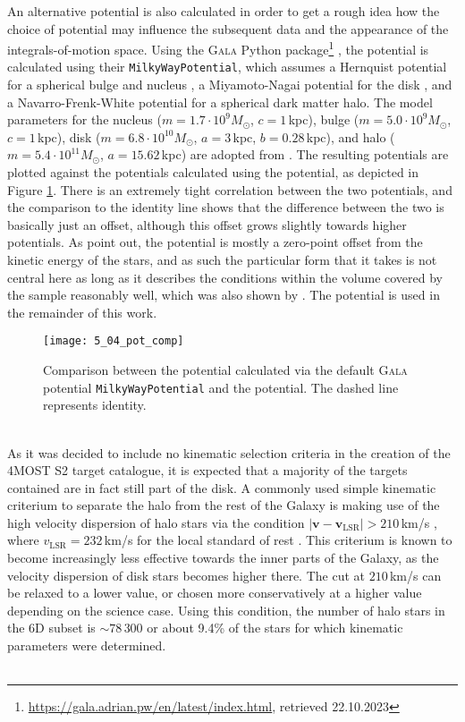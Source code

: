 \documentclass[a4paper,11pt]{article}
\begin{document}
An alternative potential is also calculated in order to get a rough idea how the choice of potential may influence the subsequent data and the appearance of the integrals-of-motion space. Using the \textsc{Gala} Python package\footnote{\url{https://gala.adrian.pw/en/latest/index.html}, retrieved 22.10.2023} \citep{gala,gala_soft}, the potential is calculated using their {\tt MilkyWayPotential}, which assumes a Hernquist potential for a spherical bulge and nucleus \citep{hernquist90}, a Miyamoto-Nagai potential for the disk \citep{bovy15,miyamoto75}, and a Navarro-Frenk-White potential for a spherical dark matter halo. The model parameters for the nucleus ($m=1.7\cdot10^9M_\odot$, $c=1$\,kpc), bulge ($m=5.0\cdot10^9M_\odot$, $c=1$\,kpc), disk ($m=6.8\cdot10^{10}M_\odot$, $a=3$\,kpc, $b=0.28$\,kpc), and halo ($m=5.4\cdot10^{11}M_\odot$, $a=15.62$\,kpc) are adopted from \citet{naidu20}. The resulting potentials are plotted against the potentials calculated using the \citet{mcmillan17} potential, as depicted in Figure \ref{fig:pot_comp}. There is an extremely tight correlation between the two potentials, and the comparison to the identity line shows that the difference between the two is basically just an offset, although this offset grows slightly towards higher potentials. As \citet{helmi17} point out, the potential is mostly a zero-point offset from the kinetic energy of the stars, and as such the particular form that it takes is not central here as long as it describes the conditions within the volume covered by the sample reasonably well, which was also shown by \citet{naidu20}. The \citet{mcmillan17} potential is used in the remainder of this work.
%
\begin{figure}[ht]
 \centering
 \texttt{[image: 5\_04\_pot\_comp]}
 \caption[Comparison of different potentials]{Comparison between the potential calculated via the default \textsc{Gala} potential {\tt MilkyWayPotential} and the \citet{mcmillan17} potential. The dashed line represents identity.}
 \label{fig:pot_comp}
\end{figure}\\
%
As it was decided to include no kinematic selection criteria in the creation of the 4MOST S2 target catalogue, it is expected that a majority of the targets contained are in fact still part of the disk. A commonly used simple kinematic criterium to separate the halo from the rest of the Galaxy is making use of the high velocity dispersion of halo stars via the condition $|\bm{v}-\bm{v}_\mathrm{LSR}|>210$\,km/s \citep[see, e.g.,][]{helmi18,ruizlara22,koppelman18}, where $v_\mathrm{LSR}=232$\,km/s for the local standard of rest \citep{mcmillan17}. This criterium is known to become increasingly less effective towards the inner parts of the Galaxy, as the velocity dispersion of disk stars becomes higher there. The cut at $210$\,km/s can be relaxed to a lower value, or chosen more conservatively at a higher value depending on the science case. Using this condition, the number of halo stars in the 6D subset is ${\sim}78\,300$ or about 9.4\% of the stars for which kinematic parameters were determined.\\ \\
\end{document}
